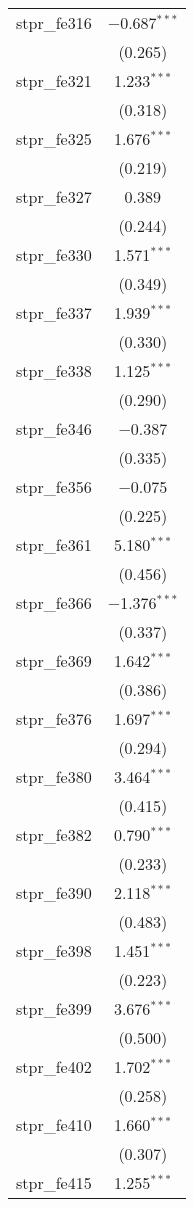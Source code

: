 \begin{table}[!htbp]
\begin{tabular}{@{\extracolsep{5pt}}lc}
  stpr\_fe316 & $-$0.687$^{***}$ \\ 
  & (0.265) \\ 
  stpr\_fe321 & 1.233$^{***}$ \\ 
  & (0.318) \\ 
  stpr\_fe325 & 1.676$^{***}$ \\ 
  & (0.219) \\ 
  stpr\_fe327 & 0.389 \\ 
  & (0.244) \\ 
  stpr\_fe330 & 1.571$^{***}$ \\ 
  & (0.349) \\ 
  stpr\_fe337 & 1.939$^{***}$ \\ 
  & (0.330) \\ 
  stpr\_fe338 & 1.125$^{***}$ \\ 
  & (0.290) \\ 
  stpr\_fe346 & $-$0.387 \\ 
  & (0.335) \\ 
  stpr\_fe356 & $-$0.075 \\ 
  & (0.225) \\ 
  stpr\_fe361 & 5.180$^{***}$ \\ 
  & (0.456) \\ 
  stpr\_fe366 & $-$1.376$^{***}$ \\ 
  & (0.337) \\ 
  stpr\_fe369 & 1.642$^{***}$ \\ 
  & (0.386) \\ 
  stpr\_fe376 & 1.697$^{***}$ \\ 
  & (0.294) \\ 
  stpr\_fe380 & 3.464$^{***}$ \\ 
  & (0.415) \\ 
  stpr\_fe382 & 0.790$^{***}$ \\ 
  & (0.233) \\ 
  stpr\_fe390 & 2.118$^{***}$ \\ 
  & (0.483) \\ 
  stpr\_fe398 & 1.451$^{***}$ \\ 
  & (0.223) \\ 
  stpr\_fe399 & 3.676$^{***}$ \\ 
  & (0.500) \\ 
  stpr\_fe402 & 1.702$^{***}$ \\ 
  & (0.258) \\ 
  stpr\_fe410 & 1.660$^{***}$ \\ 
  & (0.307) \\ 
  stpr\_fe415 & 1.255$^{***}$ \\ 

\end{tabular}
\end{table}
